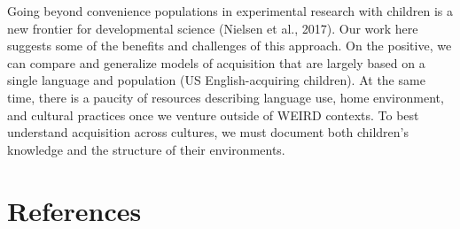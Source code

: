 \documentclass[
  english,
  ,apa7,floatsintext]{apa6}
\begin{document}
Going beyond convenience populations in experimental research with children is a new frontier for developmental science (Nielsen et al., 2017). Our work here suggests some of the benefits and challenges of this approach. On the positive, we can compare and generalize models of acquisition that are largely based on a single language and population (US English-acquiring children). At the same time, there is a paucity of resources describing language use, home environment, and cultural practices once we venture outside of WEIRD contexts. To best understand acquisition across cultures, we must document both children's knowledge and the structure of their environments.

\newpage

\hypertarget{references}{%
\section{References}\label{references}}

\begingroup
\setlength{\parindent}{-0.5in}
\setlength{\leftskip}{0.5in}
\end{document}

